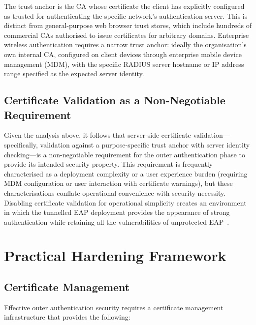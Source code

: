 \documentclass[journal]{IEEEtran}
\begin{document}
The trust anchor is the CA whose certificate the client has explicitly configured
as trusted for authenticating the specific network's authentication server. This
is distinct from general-purpose web browser trust stores, which include hundreds
of commercial CAs authorised to issue certificates for arbitrary domains. Enterprise
wireless authentication requires a narrow trust anchor: ideally the organisation's
own internal CA, configured on client devices through enterprise mobile device
management (MDM), with the specific RADIUS server hostname or IP address range
specified as the expected server identity.

\subsection{Certificate Validation as a Non-Negotiable Requirement}

Given the analysis above, it follows that server-side certificate validation---
specifically, validation against a purpose-specific trust anchor with server identity
checking---is a non-negotiable requirement for the outer authentication phase to
provide its intended security property. This requirement is frequently characterised
as a deployment complexity or a user experience burden (requiring MDM configuration
or user interaction with certificate warnings), but these characterisations conflate
operational convenience with security necessity. Disabling certificate validation
for operational simplicity creates an environment in which the tunnelled EAP
deployment provides the appearance of strong authentication while retaining all the
vulnerabilities of unprotected EAP~\cite{asokan2013}.

\section{Practical Hardening Framework}

\subsection{Certificate Management}

Effective outer authentication security requires a certificate management
infrastructure that provides the following:
\end{document}
